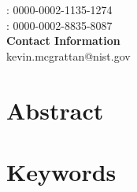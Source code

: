 \begin{titlepage}
\begin{flushleft}
  {\authorone: 0000-0002-1135-1274\\
\authortwo: 0000-0002-8835-8087\\
}
\vfill
{\textbf{Contact Information}}\\
 {
kevin.mcgrattan@nist.gov
}
\vfill



\end{flushleft}
\end{titlepage}
\begin{titlepage}
\thispagestyle{fancy}
\renewcommand{\headrulewidth}{0pt}
  \fancyhead{}
  \fancyhead[l]{\small \pubnumber \\
	\small \pubmonth~\pubyear \\}
	\fancyfoot[c]{\thepage}
\section*{Abstract}
\pubabstract
\section*{Keywords}
\keywords
\newpage
\vspace*{-3cm}\small{\pubnumber \newline  \pubmonth~\pubyear}
\vspace{18pt}
\begin{center}
	\tableofcontents
	\appendixtitleon
    \appendixtitletocon
	\listoftables
	\listoffigures
\end{center}

\end{titlepage}
\pagestyle{fancy}
\renewcommand{\headrulewidth}{0pt}
  \fancyhead{}
  \fancyhead[l]{\small \pubnumber \\
	\small \pubmonth~\pubyear \\}
